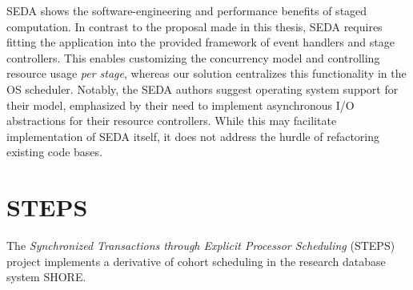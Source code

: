 \documentclass[12pt,a4paper]{book}
\begin{document}
SEDA shows the software-engineering and performance benefits of staged computation.
In contrast to the proposal made in this thesis, SEDA requires fitting the application into the provided framework of event handlers and stage controllers.
This enables customizing the concurrency model and controlling resource usage \emph{per stage}, whereas our solution centralizes this functionality in the OS scheduler.
Notably, the SEDA authors suggest operating system support for their model, emphasized by their need to implement asynchronous I/O abstractions for their resource controllers.
While this may facilitate implementation of SEDA itself, it does not address the hurdle of refactoring existing code bases.

\section{STEPS}\label{ch:relwork:steps}

The \emph{Synchronized Transactions through Explicit Processor Scheduling} (STEPS) project implements a derivative of cohort scheduling in the research database system SHORE.~\cite{shore}
\end{document}
